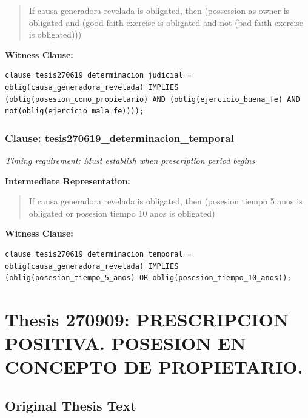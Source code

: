 \documentclass[11pt,a4paper]{article}
\begin{document}
\begin{quote}
If causa generadora revelada is obligated, then (possession as owner is obligated and (good faith exercise is obligated and not (bad faith exercise is obligated)))
\end{quote}

\textbf{Witness Clause:}

\begin{lstlisting}[style=witnessstyle, language=Witness]
clause tesis270619_determinacion_judicial = oblig(causa_generadora_revelada) IMPLIES (oblig(posesion_como_propietario) AND (oblig(ejercicio_buena_fe) AND not(oblig(ejercicio_mala_fe))));
\end{lstlisting}

\subsubsection{Clause: tesis270619\_determinacion\_temporal}

\textit{Timing requirement: Must establish when prescription period begins}

\textbf{Intermediate Representation:}

\begin{quote}
If causa generadora revelada is obligated, then (posesion tiempo 5 anos is obligated or posesion tiempo 10 anos is obligated)
\end{quote}

\textbf{Witness Clause:}

\begin{lstlisting}[style=witnessstyle, language=Witness]
clause tesis270619_determinacion_temporal = oblig(causa_generadora_revelada) IMPLIES (oblig(posesion_tiempo_5_anos) OR oblig(posesion_tiempo_10_anos));
\end{lstlisting}

\newpage

\section{Thesis 270909: PRESCRIPCION POSITIVA. POSESION EN CONCEPTO DE PROPIETARIO.}
\label{thesis:270909}

\subsection{Original Thesis Text}
\end{document}
